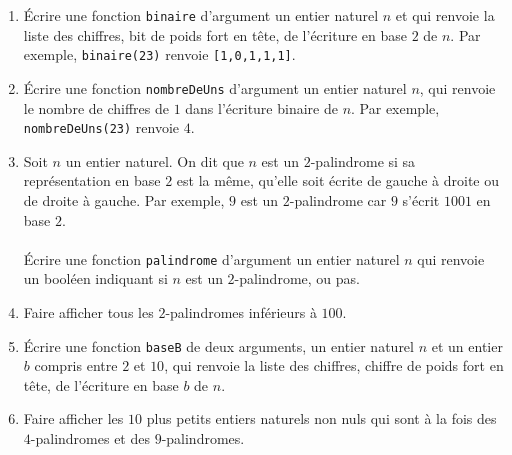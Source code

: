 \begin{exercice}
\begin{enumerate}
\item \'Ecrire une fonction \texttt{binaire} d'argument un entier naturel $n$ et qui renvoie la liste des chiffres, bit de poids fort en tête, de l'écriture en base $2$ de $n$. Par exemple, \texttt{binaire(23)} renvoie \texttt{[1,0,1,1,1]}.
\item \'Ecrire une fonction \texttt{nombreDeUns} d'argument un entier naturel $n$, qui renvoie le nombre de chiffres de $1$ dans l'écriture binaire de $n$. Par exemple, \texttt{nombreDeUns(23)} renvoie $4$.
\item Soit $n$ un entier naturel. On dit que $n$ est un $2$-palindrome si sa représentation en base $2$ est la même, qu'elle soit écrite de gauche à droite ou de droite à gauche. Par exemple, $9$ est un $2$-palindrome car $9$ s'écrit $1001$ en base $2$.\\ \\
\'Ecrire une fonction \texttt{palindrome} d'argument un entier naturel $n$ qui renvoie un booléen indiquant si $n$ est un $2$-palindrome, ou pas.
\item Faire afficher tous les $2$-palindromes inférieurs à $100$.
\item \'Ecrire une fonction \texttt{baseB} de deux arguments, un entier naturel $n$ et un entier $b$ compris entre $2$ et $10$, qui renvoie la liste des chiffres, chiffre de poids fort en tête, de l'écriture en base $b$ de $n$.
\item Faire afficher les $10$ plus petits entiers naturels non nuls qui sont à la fois des $4$-palindromes et des $9$-palindromes.
\end{enumerate}
\end{exercice}




